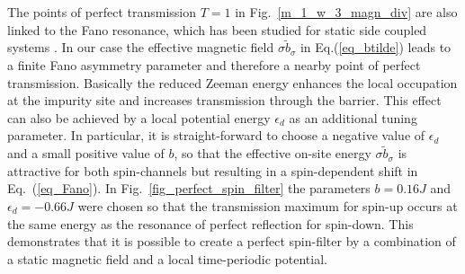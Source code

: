 \documentclass[aps,twocolumn,showpacs,floatfix,prl]{revtex4}
\begin{document}
The points of perfect transmission $T=1$ in Fig.~\ref{m_1_w_3_magn_div} are also linked to the Fano resonance, which has been studied for 
 static side coupled systems \cite{miroshnichenko2005engineering}.  In our case the effective magnetic field  $\sigma\tilde{b}_{\sigma}$ in 
Eq.(\ref{eq_btilde}) leads to a finite Fano asymmetry parameter and therefore a nearby point of perfect transmission.
Basically the reduced Zeeman energy enhances the local occupation at the impurity site and increases
transmission through the barrier.  This effect can also be achieved by a local potential energy $\epsilon_d$ as an additional tuning parameter.
In particular, it is straight-forward to choose a negative value of $\epsilon_d$ and a small positive value of $b$, so that the 
effective on-site energy $\sigma \tilde{b}_\sigma$ is attractive for both spin-channels but resulting  in a spin-dependent shift
in Eq.~(\ref{eq_Fano}).  In Fig.~\ref{fig_perfect_spin_filter} the parameters $b=0.16J$ and $\epsilon_d=-0.66J$ were chosen so that 
the transmission maximum for spin-up occurs at the same energy as the resonance of perfect reflection for spin-down.
This demonstrates that it is possible to create a perfect spin-filter by a combination of a static magnetic field 
and a local time-periodic potential.
\end{document}
